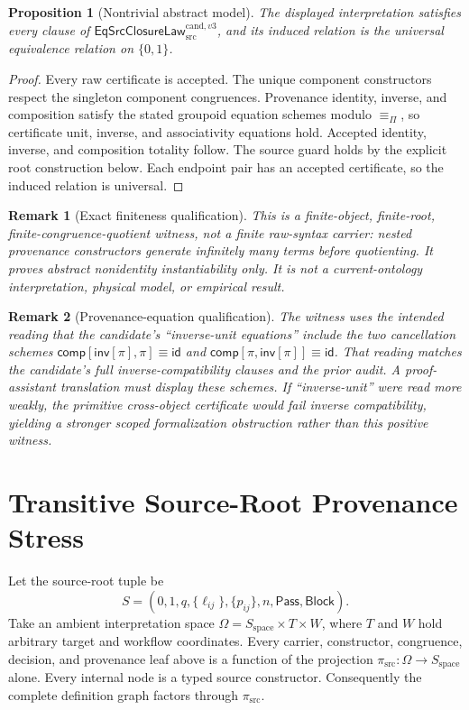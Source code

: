 \documentclass[11pt]{article}
\newtheorem{proposition}{Proposition}
\newtheorem{remark}{Remark}
\newcommand{\Law}{\mathsf{EqSrcClosureLaw}^{\mathrm{cand},v3}_{\mathrm{src}}}
\newcommand{\Pass}{\mathsf{Pass}}
\newcommand{\Block}{\mathsf{Block}}
\begin{document}
\begin{proposition}[Nontrivial abstract model]
The displayed interpretation satisfies every clause of \(\Law\), and its
induced relation is the universal equivalence relation on \(\{0,1\}\).
\end{proposition}

\begin{proof}
Every raw certificate is accepted. The unique component constructors respect
the singleton component congruences. Provenance identity, inverse, and
composition satisfy the stated groupoid equation schemes modulo
\(\equiv_{\Pi}\), so certificate unit, inverse, and associativity equations
hold. Accepted identity, inverse, and composition totality follow. The source
guard holds by the explicit root construction below. Each endpoint pair has
an accepted certificate, so the induced relation is universal.
\end{proof}

\begin{remark}[Exact finiteness qualification]
This is a finite-object, finite-root, finite-congruence-quotient witness, not a
finite raw-syntax carrier: nested provenance constructors generate infinitely
many terms before quotienting. It proves abstract nonidentity instantiability
only. It is not a current-ontology interpretation, physical model, or empirical
result.
\end{remark}

\begin{remark}[Provenance-equation qualification]
The witness uses the intended reading that the candidate's ``inverse-unit
equations'' include the two cancellation schemes
\(\mathsf{comp}[\mathsf{inv}[\pi],\pi]\equiv\mathsf{id}\) and
\(\mathsf{comp}[\pi,\mathsf{inv}[\pi]]\equiv\mathsf{id}\).
That reading matches the candidate's full inverse-compatibility clauses and
the prior audit. A proof-assistant translation must display these schemes.
If ``inverse-unit'' were read more weakly, the primitive cross-object
certificate would fail inverse compatibility, yielding a stronger scoped
formalization obstruction rather than this positive witness.
\end{remark}

\section{Transitive Source-Root Provenance Stress}

Let the source-root tuple be
\[
 S=(0,1,q,\{\ell_{ij}\},\{p_{ij}\},n,\Pass,\Block).
\]
Take an ambient interpretation space
\(\Omega=S_{\mathrm{space}}\times T\times W\), where \(T\) and \(W\) hold
arbitrary target and workflow coordinates. Every carrier, constructor,
congruence, decision, and provenance leaf above is a function of the
projection \(\pi_{\mathrm{src}}:\Omega\to S_{\mathrm{space}}\) alone.
Every internal node is a typed source constructor. Consequently the complete
definition graph factors through \(\pi_{\mathrm{src}}\).
\end{document}
